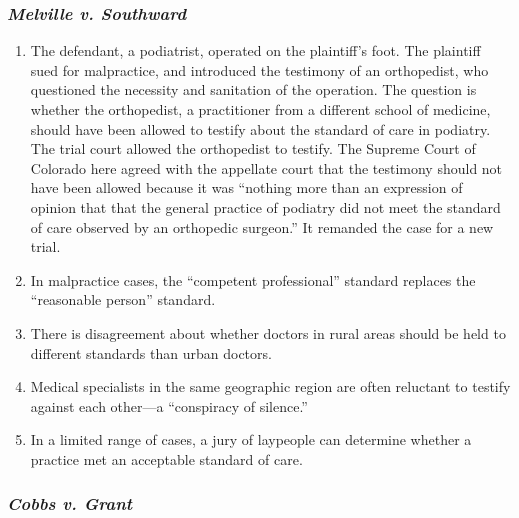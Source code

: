 \subsubsection{\emph{Melville v. Southward}}

\begin{enumerate}
    \item The defendant, a podiatrist, operated on the plaintiff's foot. The plaintiff sued for malpractice, and introduced the testimony of an orthopedist, who questioned the necessity and sanitation of the operation. The question is whether the orthopedist, a practitioner from a different school of medicine, should have been allowed to testify about the standard of care in podiatry. The trial court allowed the orthopedist to testify. The Supreme Court of Colorado here agreed with the appellate court that the testimony should not have been allowed because it was ``nothing more than an expression of opinion that that the general practice of podiatry did not meet the standard of care observed by an orthopedic surgeon.'' It remanded the case for a new trial.
    \item In malpractice cases, the ``competent professional'' standard replaces the ``reasonable person'' standard.
    \item There is disagreement about whether doctors in rural areas should be held to different standards than urban doctors.
    \item Medical specialists in the same geographic region are often reluctant to testify against each other---a ``conspiracy of silence.''
    \item In a limited range of cases, a jury of laypeople can determine whether a practice met an acceptable standard of care.
\end{enumerate}

\subsubsection{\emph{Cobbs v. Grant}}

